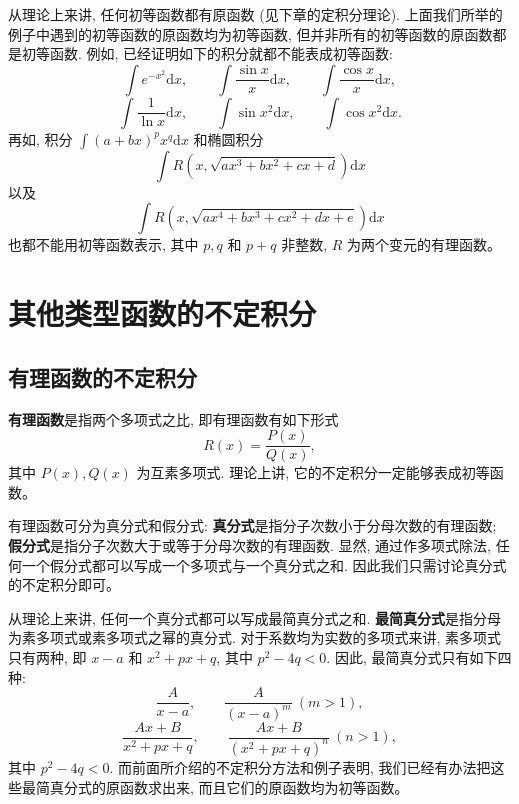 \documentclass[UTF8,12pt,a4paper,fontset=fandol]{ctexart}
\begin{document}
从理论上来讲, 任何初等函数都有原函数 (见下章的定积分理论). 上面我们所举的例子中遇到的初等函数的原函数均为初等函数, 但并非所有的初等函数的原函数都是初等函数. 例如, 已经证明如下的积分就都不能表成初等函数:
\[
  \int e^{-x^2}\mathrm dx,\qquad
  \int\frac{\sin x}{x}\mathrm dx,\qquad
  \int\frac{\cos x}{x}\mathrm dx,
\]
\[
  \int\frac1{\ln x}\mathrm dx,\qquad
  \int\sin x^2\mathrm dx,\qquad
  \int\cos x^2\mathrm dx.
\]
再如, 积分 $\int(a+bx)^px^q\mathrm dx$ 和椭圆积分
\[
  \int R(x,\sqrt{ax^3+bx^2+cx+d})\mathrm dx
\]
以及
\[
  \int R(x,\sqrt{ax^4+bx^3+cx^2+dx+e})\mathrm dx
\]
也都不能用初等函数表示, 其中 $p,q$ 和 $p+q$ 非整数, $R$ 为两个变元的有理函数。

\section{其他类型函数的不定积分}

\subsection{有理函数的不定积分}

\textbf{有理函数}是指两个多项式之比, 即有理函数有如下形式
\[
  R(x)=\frac{P(x)}{Q(x)},
\]
其中 $P(x),Q(x)$ 为互素多项式. 理论上讲, 它的不定积分一定能够表成初等函数。

有理函数可分为真分式和假分式: \textbf{真分式}是指分子次数小于分母次数的有理函数; \textbf{假分式}是指分子次数大于或等于分母次数的有理函数. 显然, 通过作多项式除法, 任何一个假分式都可以写成一个多项式与一个真分式之和. 因此我们只需讨论真分式的不定积分即可。

从理论上来讲, 任何一个真分式都可以写成最简真分式之和. \textbf{最简真分式}是指分母为素多项式或素多项式之幂的真分式. 对于系数均为实数的多项式来讲, 素多项式只有两种, 即 $x-a$ 和 $x^2+px+q$, 其中 $p^2-4q<0$. 因此, 最简真分式只有如下四种:
\[
  \frac A{x-a},\qquad
  \frac A{(x-a)^m}\ (m>1),
\]
\[
  \frac{Ax+B}{x^2+px+q},\qquad
  \frac{Ax+B}{(x^2+px+q)^n}\ (n>1),
\]
其中 $p^2-4q<0$. 而前面所介绍的不定积分方法和例子表明, 我们已经有办法把这些最简真分式的原函数求出来, 而且它们的原函数均为初等函数。
\end{document}
